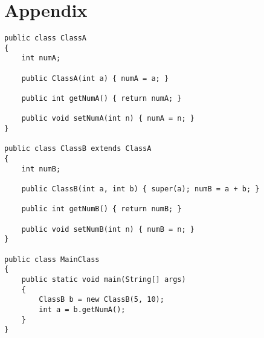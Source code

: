 \chapter{Appendix}

\lstset{
	language=Java,
	basicstyle=\small,
	stringstyle=\ttfamily
}

\begin{lstlisting}[frame=single, title= Java Code]
public class ClassA
{	
    int numA;
	
    public ClassA(int a) { numA = a; }
	
    public int getNumA() { return numA; }
    
    public void setNumA(int n) { numA = n; }
}

public class ClassB extends ClassA
{
    int numB;
	
    public ClassB(int a, int b) { super(a); numB = a + b; }
	
    public int getNumB() { return numB; }
    
    public void setNumB(int n) { numB = n; }
}

public class MainClass
{
    public static void main(String[] args)
    {
        ClassB b = new ClassB(5, 10);
        int a = b.getNumA();
    }
}
\end{lstlisting}

\newpage

\lstset{
	language=C,
	basicstyle=\tiny,
	stringstyle=\ttfamily
}

